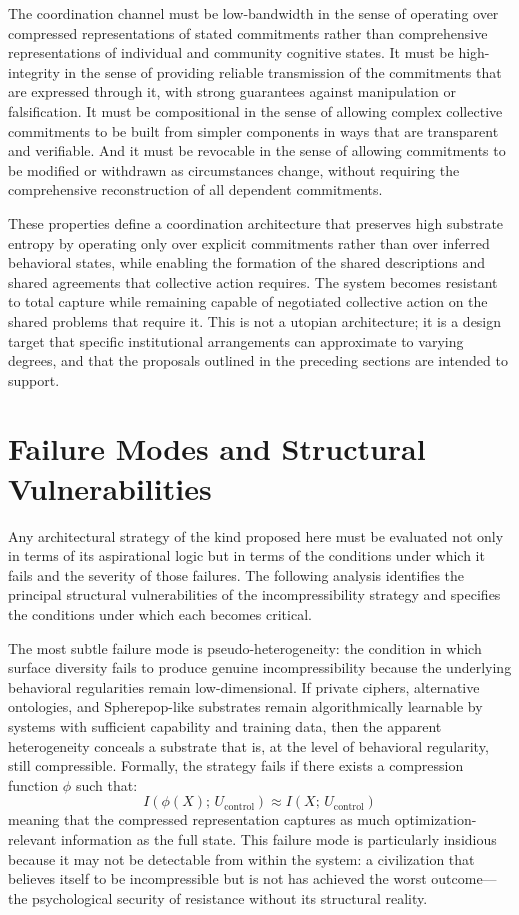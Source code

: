 \documentclass[12pt]{article}
\begin{document}
The coordination channel must be low-bandwidth in the sense of operating over compressed representations of stated commitments rather than comprehensive representations of individual and community cognitive states. It must be high-integrity in the sense of providing reliable transmission of the commitments that are expressed through it, with strong guarantees against manipulation or falsification. It must be compositional in the sense of allowing complex collective commitments to be built from simpler components in ways that are transparent and verifiable. And it must be revocable in the sense of allowing commitments to be modified or withdrawn as circumstances change, without requiring the comprehensive reconstruction of all dependent commitments.

These properties define a coordination architecture that preserves high substrate entropy by operating only over explicit commitments rather than over inferred behavioral states, while enabling the formation of the shared descriptions and shared agreements that collective action requires. The system becomes resistant to total capture while remaining capable of negotiated collective action on the shared problems that require it. This is not a utopian architecture; it is a design target that specific institutional arrangements can approximate to varying degrees, and that the proposals outlined in the preceding sections are intended to support.

\section{Failure Modes and Structural Vulnerabilities}

Any architectural strategy of the kind proposed here must be evaluated not only in terms of its aspirational logic but in terms of the conditions under which it fails and the severity of those failures. The following analysis identifies the principal structural vulnerabilities of the incompressibility strategy and specifies the conditions under which each becomes critical.

The most subtle failure mode is pseudo-heterogeneity: the condition in which surface diversity fails to produce genuine incompressibility because the underlying behavioral regularities remain low-dimensional. If private ciphers, alternative ontologies, and Spherepop-like substrates remain algorithmically learnable by systems with sufficient capability and training data, then the apparent heterogeneity conceals a substrate that is, at the level of behavioral regularity, still compressible. Formally, the strategy fails if there exists a compression function $\phi$ such that:
\[
I(\phi(X);\, U_{\text{control}}) \approx I(X;\, U_{\text{control}})
\]
meaning that the compressed representation captures as much optimization-relevant information as the full state. This failure mode is particularly insidious because it may not be detectable from within the system: a civilization that believes itself to be incompressible but is not has achieved the worst outcome---the psychological security of resistance without its structural reality.
\end{document}
